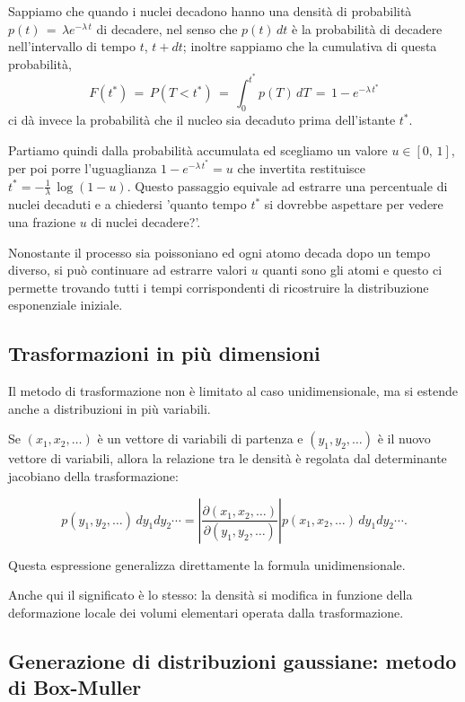 Sappiamo che quando i nuclei decadono hanno una densità di probabilità $p(t)\,=\, \lambda e^{-\lambda \, t}$ di decadere, nel senso che $p(t)\,dt$ è la probabilità di decadere nell'intervallo di tempo $t$, $t+dt$; inoltre sappiamo che la cumulativa di questa probabilità, 
\[F(t^*)\,=\, P(T<t^*)\,=\, \int_0^{t^*} p(T)\, dT\,=\, 1-e^{-\lambda \, t^*}\]
ci dà invece la probabilità che il nucleo sia decaduto prima dell'istante $t^*$.

Partiamo quindi dalla probabilità accumulata ed scegliamo un valore $u\in[0,\, 1]$, per poi porre l'uguaglianza $1-e^{-\lambda \, t^*}=u$ che invertita restituisce $t^*=-\frac{1}{\lambda}\, \log(1-u)$. Questo passaggio equivale ad estrarre una percentuale di nuclei decaduti e a chiedersi 'quanto tempo $t^*$ si dovrebbe aspettare per vedere una frazione $u$ di nuclei decadere?'.

Nonostante il processo sia poissoniano ed ogni atomo decada dopo un tempo diverso, si può continuare ad estrarre valori $u$ quanti sono gli atomi e questo ci permette trovando tutti i tempi corrispondenti di ricostruire la distribuzione esponenziale iniziale.

%
%
%
\vspace{0.5cm}
\subsection{Trasformazioni in più dimensioni}

Il metodo di trasformazione non è limitato al caso unidimensionale, ma si estende anche a distribuzioni in più variabili.

Se $(x_1,x_2,\dots)$ è un vettore di variabili di partenza e $(y_1,y_2,\dots)$ è il nuovo vettore di variabili, allora la relazione tra le densità è regolata dal determinante jacobiano della trasformazione:

\[
p(y_1,y_2,\dots)\,dy_1dy_2\cdots
=
\left|
\frac{\partial(x_1,x_2,\dots)}{\partial(y_1,y_2,\dots)}
\right|
p(x_1,x_2,\dots)\,dy_1dy_2\cdots .
\]

Questa espressione generalizza direttamente la formula unidimensionale.

Anche qui il significato è lo stesso: la densità si modifica in funzione della deformazione locale dei volumi elementari operata dalla trasformazione.


\vspace{0.5cm}
\subsection{Generazione di distribuzioni gaussiane: metodo di Box-Muller}

